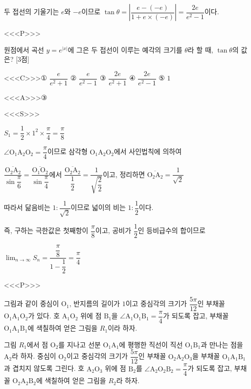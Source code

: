 \documentclass{oblivoir}
\begin{document}
두 접선의 기울기는 $e$와 $-e$이므로 $\tan\theta =\left |\dfrac{e-(-e)}{1+e\times(-e)}\right | =\dfrac{2e}{e^{2}-1}$이다.

<<<P>>>

원점에서 곡선 $y=e^{| x |}$에 그은 두 접선이 이루는 예각의 크기를 $\theta$라 할 때, $\tan\theta$의 값은? [3점]

<<<C>>>① $\dfrac{e}{e^{2}+1}$ ② $\dfrac{e}{e^{2}-1}$ ③ $\dfrac{2e}{e^{2}+1}$ ④ $\dfrac{2e}{e^{2}-1}$ ⑤ $1$

<<<A>>>③

<<<S>>>

$S_{1}=\dfrac{1}{2}\times 1^{2}\times\dfrac{\pi}{4}=\dfrac{\pi}{8}$

$∠\mathrm{O}_{1}\mathrm{A}_{2}\mathrm{O}_{2}=\dfrac{\pi}{4}$이므로 삼각형 $\mathrm{O}_{1}\mathrm{A}_{2}\mathrm{O}_{2}$에서 사인법칙에 의하여

$\overline{\dfrac{\mathrm{O}_{2} \mathrm{A}_{2}}{\sin\dfrac{\pi}{6}}}=\overline{\dfrac{\mathrm{O}_{1} \mathrm{O}_{2}}{\sin\dfrac{\pi}{4}}}$에서 $\overline{\dfrac{\mathrm{O}_{2} \mathrm{A}_{2}}{\dfrac{1}{2}}}=\dfrac{1}{\sqrt{\dfrac{2}{2}}}$이고, 정리하면 $\overline{\mathrm{O_{2}A_{2}}}=\dfrac{1}{\sqrt{2}}$

따라서 닮음비는 $1 :\dfrac{1}{\sqrt{2}}$이므로 넓이의 비는 $1 :\dfrac{1}{2}$이다.

즉, 구하는 극한값은 첫째항이 $\dfrac{\pi}{8}$이고, 공비가 $\dfrac{1}{2}$인 등비급수의 합이므로

$\displaystyle\lim_{n\to \infty}S_{n}=\dfrac{\dfrac{\pi}{8}}{1-\dfrac{1}{2}}=\dfrac{\pi}{4}$

<<<P>>>

그림과 같이 중심이 $\mathrm{O}_{1}$, 반지름의 길이가 $1$이고 중심각의 크기가 $\dfrac{5\pi}{12}$인 부채꼴 $\mathrm{O}_{1}\mathrm{A}_{1}\mathrm{O}_{2}$가 있다. 호 $\mathrm{A}_{1}\mathrm{O}_{2}$ 위에 점 $\mathrm{B}_{1}$을 $∠\mathrm{A}_{1}\mathrm{O}_{1}\mathrm{B}_{1}=\dfrac{\pi}{4}$가 되도록 잡고, 부채꼴 $\mathrm{O}_{1}\mathrm{A}_{1}\mathrm{B}_{1}$에 색칠하여 얻은 그림을 $R_{1}$이라 하자.

그림 $R_{1}$에서 점 $\mathrm{O}_{2}$를 지나고 선분 $\mathrm{O}_{1}\mathrm{A}_{1}$에 평행한 직선이 직선 $\mathrm{O}_{1}\mathrm{B}_{1}$과 만나는 점을 $\mathrm{A}_{2}$라 하자. 중심이 $\mathrm{O}_{2}$이고 중심각의 크기가 $\dfrac{5\pi}{12}$인 부채꼴 $\mathrm{O}_{2}\mathrm{A}_{2}\mathrm{O}_{3}$을 부채꼴 $\mathrm{O}_{1}\mathrm{A}_{1}\mathrm{B}_{1}$과 겹치지 않도록 그린다. 호 $\mathrm{A}_{2}\mathrm{O}_{3}$ 위에 점 $\mathrm{B}_{2}$를 $∠\mathrm{A}_{2}\mathrm{O}_{2}\mathrm{B}_{2}=\dfrac{\pi}{4}$가 되도록 잡고, 부채꼴 $\mathrm{O}_{2}\mathrm{A}_{2}\mathrm{B}_{2}$에 색칠하여 얻은 그림을 $R_{2}$라 하자.
\end{document}
